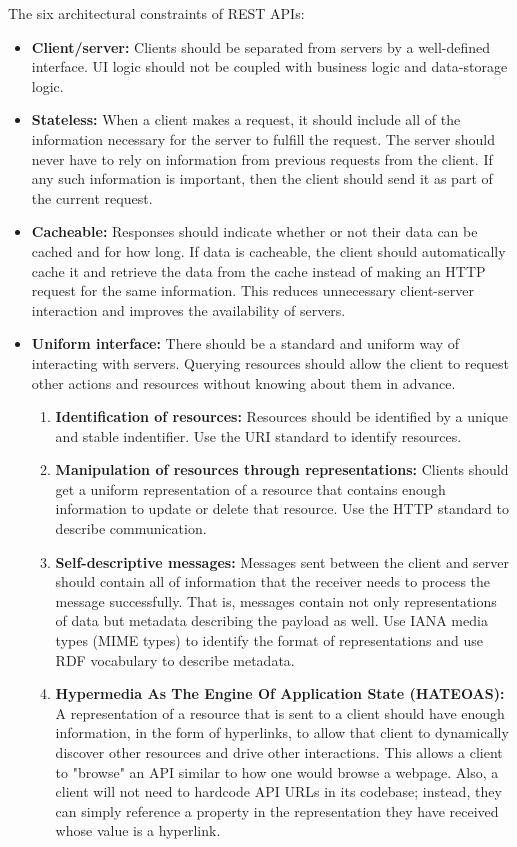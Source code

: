 \documentclass[12pt, titlepage]{article}
\begin{document}
The six architectural constraints of REST APIs:
\begin{itemize}
  \item \textbf{Client/server:} Clients should be separated from servers by a well-defined interface. UI logic should not be coupled with business logic and data-storage logic.
  \item \textbf{Stateless:} When a client makes a request, it should include all of the information necessary for the server to fulfill the request. The server should never have to rely on information from previous requests from the client. If any such information is important, then the client should send it as part of the current request.
  \item \textbf{Cacheable:} Responses should indicate whether or not their data can be cached and for how long. If data is cacheable, the client should automatically cache it and retrieve the data from the cache instead of making an HTTP request for the same information. This reduces unnecessary client-server interaction and improves the availability of servers.
  \item \textbf{Uniform interface:} There should be a standard and uniform way of interacting with servers. Querying resources should allow the client to request other actions and resources without knowing about them in advance.
  \begin{enumerate}
    \item \textbf{Identification of resources:} Resources should be identified by a unique and stable indentifier. Use the URI standard to identify resources.
    \item \textbf{Manipulation of resources through representations:} Clients should get a uniform representation of a resource that contains enough information to update or delete that resource. Use the HTTP standard to describe communication.
    \item \textbf{Self-descriptive messages:} Messages sent between the client and server should contain all of information that the receiver needs to process the message successfully. That is, messages contain not only representations of data but metadata describing the payload as well. Use IANA media types (MIME types) to identify the format of representations and use RDF vocabulary to describe metadata.
    \item \textbf{Hypermedia As The Engine Of Application State (HATEOAS):} A representation of a resource that is sent to a client should have enough information, in the form of hyperlinks, to allow that client to dynamically discover other resources and drive other interactions. This allows a client to "browse" an API similar to how one would browse a webpage. Also, a client will not need to hardcode API URLs in its codebase; instead, they can simply reference a property in the representation they have received whose value is a hyperlink.

\end{enumerate}
\end{itemize}
\end{document}
